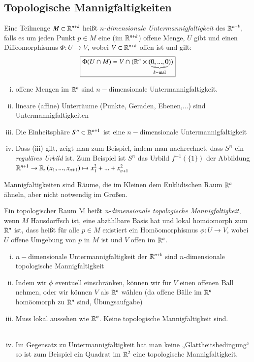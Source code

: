 \documentclass[a4paper,10pt]{scrartcl}
\begin{document}
\subsection{Topologische Mannigfaltigkeiten}
\begin{df}
Eine Teilmenge $M\subset \mathbb{R}^{n+k}$ heißt \emph{$n$-dimensionale Untermannigfaltigkeit} des $\mathbb{R}^{n+k}$, falls es um jeden Punkt $p\in M$ eine (im $\mathbb{R}^{n+k}$) offene Menge, $U$ gibt und einen Diffeomorphismus $\Phi: U\to V$, wobei $V\subset \mathbb{R}^{n+k}$ offen ist und gilt:
\fixme[fig30]
\[
 \boxed{\Phi(U\cap M)=V\cap(\mathbb{R}^n\times(\underbrace{0,...,0}_{k-\text{mal}}))}
\]
\end{df}
\begin{exs*}
 \begin{enumerate}[(i)]
  \item offene Mengen im $\mathbb{R}^n$ sind $n-$dimensionale Untermannigfaltigkeit.
  \item lineare (affine) Unterräume (Punkte, Geraden, Ebenen,...) sind Untermannigfaltigkeiten
  \item Die Einheitsphäre $S^n\subset \mathbb{R}^{n+1}$ ist eine $n-$dimensionale Untermannigfaltigkeit
  \item Dass (iii) gilt, zeigt man zum Beispiel, indem man nachrechnet, dass $S^n$ ein \emph{reguläres Urbild} ist. Zum Beispiel ist $S^n$ das Urbild $f^{-1}(\{1\})$ der Abbildung $\mathbb{R}^{n+1}\to \mathbb{R}, (x_1,...,x_{n+1})\mapsto x_1^2+...+x_{n+1}^2$
 \end{enumerate}
Mannigfaltigkeiten sind Räume, die im Kleinen dem Euklidischen Raum $\mathbb{R}^n$ ähneln, aber nicht notwendig im Großen.
\end{exs*}
\begin{df}
 Ein topologischer Raum M heißt \emph{n-dimensionale topologische Mannigfaltigkeit}, wenn $M$ Hausdorffsch ist, eine abzählbare Basis hat und lokal homöomorph zum $\mathbb{R}^n$ ist, dass heißt für alle $p\in M$ existiert ein Homöomorphismus $\phi:U\to V$, wobei $U$ offene Umgebung von $p$ in $M$ ist und $V$ offen im $\mathbb{R}^n$.
\end{df}
\fixme[fig31]
\begin{note*}
 \begin{enumerate}[(i)]
  \item $n-$dimensionale Untermannigfaltigkeit der $\mathbb{R}^{n+k}$ sind $n$-dimensionale topologische Mannigfaltigkeit
  \item Indem wir $\phi$ eventuell einschränken, können wir für $V$ einen offenen Ball nehmen, oder wir können $V$ als $\mathbb{R}^n$ wählen (da offene Bälle im $\mathbb{R}^n$ homöomorph zu $\mathbb{R}^n$ sind, Übungsaufgabe)
  \item Muss lokal aussehen wie $\mathbb{R}^n$. Keine topologische Mannigfaltigkeit sind.\\
\fixme[fig32]\\
\item Im Gegensatz zu Untermannigfaltigkeit hat man keine „Glattheitsbedingung“ so ist zum Beispiel ein Quadrat im $\mathbb{R}^2$ eine topologische Mannigfaltigkeit.
 \end{enumerate}
\end{note*}
\end{document}
